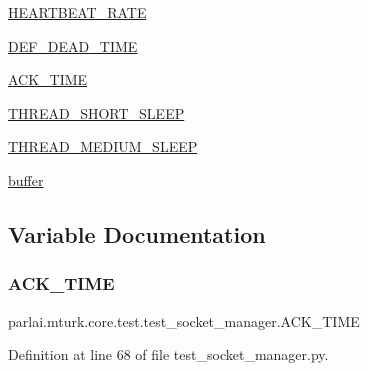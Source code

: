 \begin{DoxyCompactItemize}
\item 
\hyperlink{namespaceparlai_1_1mturk_1_1core_1_1test_1_1test__socket__manager_a372be4fd75c100f0615d8fa903460e9a}{H\+E\+A\+R\+T\+B\+E\+A\+T\+\_\+\+R\+A\+TE}
\item 
\hyperlink{namespaceparlai_1_1mturk_1_1core_1_1test_1_1test__socket__manager_a39be55edb7de390010383fd9f9432128}{D\+E\+F\+\_\+\+D\+E\+A\+D\+\_\+\+T\+I\+ME}
\item 
\hyperlink{namespaceparlai_1_1mturk_1_1core_1_1test_1_1test__socket__manager_acd23c63a260d75cb43eb9645dcafb0f1}{A\+C\+K\+\_\+\+T\+I\+ME}
\item 
\hyperlink{namespaceparlai_1_1mturk_1_1core_1_1test_1_1test__socket__manager_a48b372b1a564517fe6a2e83012246d7e}{T\+H\+R\+E\+A\+D\+\_\+\+S\+H\+O\+R\+T\+\_\+\+S\+L\+E\+EP}
\item 
\hyperlink{namespaceparlai_1_1mturk_1_1core_1_1test_1_1test__socket__manager_ae646d9eecf760c5bbe0ed6b1a92b32b7}{T\+H\+R\+E\+A\+D\+\_\+\+M\+E\+D\+I\+U\+M\+\_\+\+S\+L\+E\+EP}
\item 
\hyperlink{namespaceparlai_1_1mturk_1_1core_1_1test_1_1test__socket__manager_aada2ea82bdb7a2000aa00b33e5925794}{buffer}
\end{DoxyCompactItemize}


\subsection{Variable Documentation}
\mbox{\label{namespaceparlai_1_1mturk_1_1core_1_1test_1_1test__socket__manager_acd23c63a260d75cb43eb9645dcafb0f1}} 
\subsubsection{\texorpdfstring{A\+C\+K\+\_\+\+T\+I\+ME}{ACK\_TIME}}
{\footnotesize\ttfamily parlai.\+mturk.\+core.\+test.\+test\+\_\+socket\+\_\+manager.\+A\+C\+K\+\_\+\+T\+I\+ME}



Definition at line 68 of file test\+\_\+socket\+\_\+manager.\+py.


